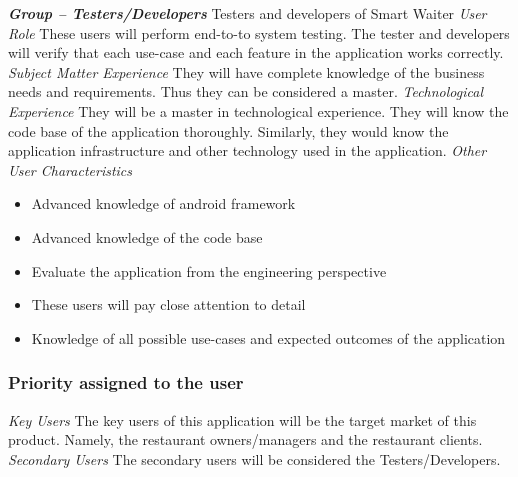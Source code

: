 \documentclass[12pt, titlepage]{article}
\begin{document}
\noindent\textbf{\textit{Group – Testers/Developers}}\newline
Testers and developers of Smart Waiter \newline
\newline
\textit{User Role}\newline
These users will perform end-to-to system testing. The tester and developers will verify that each use-case and each feature in the application works correctly. \newline\newline
\textit{Subject Matter Experience}\newline
They will have complete knowledge of the business needs and requirements. Thus they can be considered a master. \newline\newline
\textit{Technological Experience}\newline
They will be a master in technological experience. They will know the code base of the application thoroughly. Similarly, they would know the application infrastructure and other technology used in the application. \newline\newline
\textit{Other User Characteristics}
\begin{itemize}
  \item Advanced knowledge of android framework
  \item Advanced knowledge of the code base
  \item 	Evaluate the application from the engineering perspective
  \item 	These users will pay close attention to detail
  \item 	Knowledge of all possible use-cases and expected outcomes of the application
\end{itemize}

\subsubsection{Priority assigned to the user}
\textit{Key Users }\newline
The key users of this application will be the target market of this product. Namely, the restaurant owners/managers and the restaurant clients.\newline
\newline
\textit{Secondary Users}\newline
The secondary users will be considered the Testers/Developers.
\newline
\end{document}

